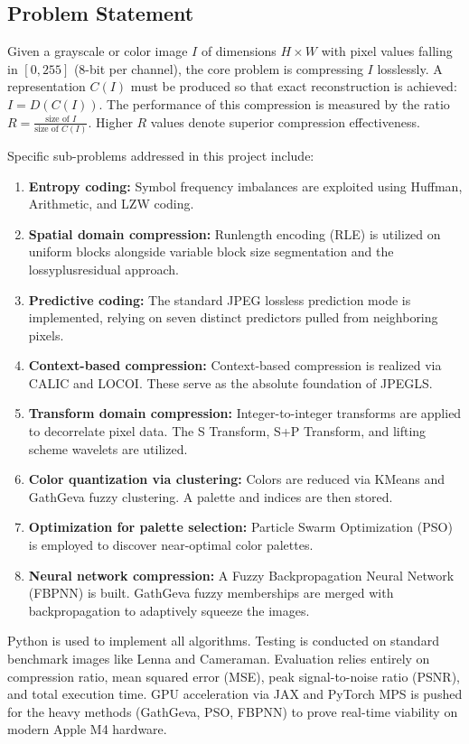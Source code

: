 \subsection{Problem Statement}

Given a grayscale or color image $I$ of dimensions $H \times W$ with pixel values falling in $[0, 255]$ (8-bit per channel), the core problem is compressing $I$ losslessly. A representation $C(I)$ must be produced so that exact reconstruction is achieved: $I = D(C(I))$. The performance of this compression is measured by the ratio $R = \frac{\text{size of }I}{\text{size of }C(I)}$. Higher $R$ values denote superior compression effectiveness.

Specific sub-problems addressed in this project include:

\begin{enumerate}
    \item \textbf{Entropy coding:} Symbol frequency imbalances are exploited using Huffman, Arithmetic, and LZW coding.
    \item \textbf{Spatial domain compression:} Runlength encoding (RLE) is utilized on uniform blocks alongside variable block size segmentation and the lossyplusresidual approach.
    \item \textbf{Predictive coding:} The standard JPEG lossless prediction mode is implemented, relying on seven distinct predictors pulled from neighboring pixels.
    \item \textbf{Context-based compression:} Context-based compression is realized via CALIC and LOCOI. These serve as the absolute foundation of JPEGLS.
    \item \textbf{Transform domain compression:} Integer-to-integer transforms are applied to decorrelate pixel data. The S Transform, S+P Transform, and lifting scheme wavelets are utilized.
    \item \textbf{Color quantization via clustering:} Colors are reduced via KMeans and GathGeva fuzzy clustering. A palette and indices are then stored.
    \item \textbf{Optimization for palette selection:} Particle Swarm Optimization (PSO) is employed to discover near-optimal color palettes.
    \item \textbf{Neural network compression:} A Fuzzy Backpropagation Neural Network (FBPNN) is built. GathGeva fuzzy memberships are merged with backpropagation to adaptively squeeze the images.
\end{enumerate}

Python is used to implement all algorithms. Testing is conducted on standard benchmark images like Lenna and Cameraman. Evaluation relies entirely on compression ratio, mean squared error (MSE), peak signal-to-noise ratio (PSNR), and total execution time. GPU acceleration via JAX and PyTorch MPS is pushed for the heavy methods (GathGeva, PSO, FBPNN) to prove real-time viability on modern Apple M4 hardware.

